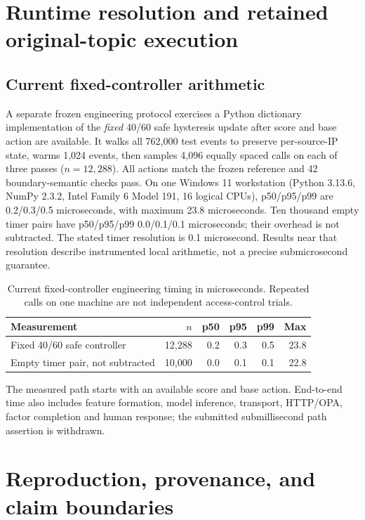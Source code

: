 \documentclass[10pt,onecolumn]{IEEEtran}
\begin{document}
\section{Runtime resolution and retained original-topic execution}
\label{sec:supp_runtime}

\subsection{Current fixed-controller arithmetic}
A separate frozen engineering protocol exercises
a Python dictionary implementation of the
\emph{fixed} 40/60 safe hysteresis update
after score and base action are available.
It walks all 762,000 test events to preserve
per-source-IP state, warms 1,024 events,
then samples 4,096 equally spaced calls
on each of three passes (\(n=12,288\)).
All actions match the frozen reference and
42 boundary-semantic checks pass.
On one Windows 11 workstation
(Python 3.13.6, NumPy 2.3.2,
Intel Family 6 Model 191, 16 logical CPUs),
p50/p95/p99 are 0.2/0.3/0.5 microseconds,
with maximum 23.8 microseconds.
Ten thousand empty timer pairs have
p50/p95/p99 0.0/0.1/0.1 microseconds;
their overhead is not subtracted.
The stated timer resolution is
0.1 microsecond. Results near that
resolution describe instrumented
local arithmetic, not a precise
submicrosecond guarantee.
\begin{table}[!htbp]
\centering
\caption{Current fixed-controller engineering timing
in microseconds. Repeated calls on one machine are
not independent access-control trials.}
\label{tab:supp_timing}
\footnotesize
\begin{tabular}{lrrrrr}
\toprule
Measurement & \(n\) & p50 & p95 & p99 & Max\\
\midrule
Fixed 40/60 safe controller & 12,288 & 0.2 & 0.3 & 0.5 & 23.8\\
Empty timer pair, not subtracted & 10,000 & 0.0 & 0.1 & 0.1 & 22.8\\
\bottomrule
\end{tabular}
\end{table}
The measured path starts with an available score
and base action. End-to-end time also includes
feature formation, model inference, transport,
HTTP/OPA, factor completion and human response;
the submitted submillisecond path assertion is
withdrawn.



\section{Reproduction, provenance, and claim boundaries}
\label{sec:supp_reproduction}
\end{document}

